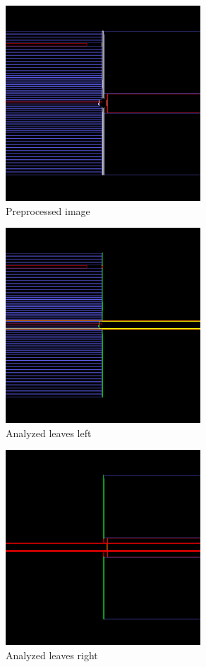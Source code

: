 \begin{figure}[H]
    \centering
    \includegraphics[width=0.65\textwidth]{Content/Images/analysis_la_faulty_preprocessed_image.png}
    \caption{Preprocessed image}
\end{figure}

\begin{figure}[H]
    \centering
    \includegraphics[width=0.65\textwidth]{Content/Images/analysis_la_faulty_left_leaves.png}
    \caption{Analyzed leaves left}
\end{figure}

\begin{figure}[H]
    \centering
    \includegraphics[width=0.65\textwidth]{Content/Images/analysis_la_faulty_right_leaves.png}
    \caption{Analyzed leaves right}
\end{figure}

